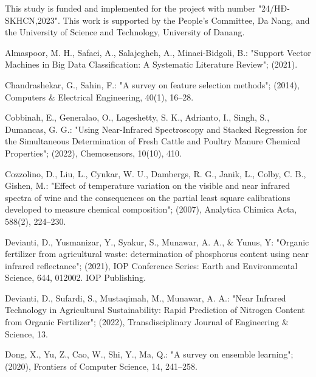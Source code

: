 \documentclass[10pt, a4paper, oneside]{article}
\begin{document}
\begin{Acknowledgements}
This study is funded and implemented for the project with number "24/HĐ-SKHCN,2023". This work is supported by the People’s Committee, Da Nang, and the University of Science and
Technology, University of Danang.
\end{Acknowledgements}

\begin{thebibliography}{}{

\fontsize{9pt}{10pt}\selectfont

 Almaspoor, M. H., Safaei, A., Salajegheh, A., Minaei-Bidgoli, B.: "Support Vector Machines in Big Data Classification: A Systematic Literature Review";  (2021).

 Chandrashekar, G., Sahin, F.: "A survey on feature selection methods"; (2014), Computers \& Electrical Engineering, 40(1), 16–28.

 Cobbinah, E., Generalao, O., Lageshetty, S. K., Adrianto, I., Singh, S., Dumancas, G. G.: "Using Near-Infrared Spectroscopy and Stacked Regression for the Simultaneous Determination of Fresh Cattle and Poultry Manure Chemical Properties"; (2022), Chemosensors, 10(10), 410.

 Cozzolino, D., Liu, L., Cynkar, W. U., Dambergs, R. G., Janik, L., Colby, C. B., Gishen, M.: "Effect of temperature variation on the visible and near infrared spectra of wine and the consequences on the partial least square calibrations developed to measure chemical composition"; (2007), Analytica Chimica Acta, 588(2), 224–230.

 Devianti, D., Yusmanizar, Y., Syakur, S., Munawar, A. A., \& Yunus, Y: "Organic fertilizer from agricultural waste: determination of phosphorus content using near infrared reflectance"; (2021), IOP Conference Series: Earth and Environmental Science, 644, 012002. IOP Publishing.

 Devianti, D., Sufardi, S., Mustaqimah, M., Munawar, A. A.: "Near Infrared Technology in Agricultural Sustainability: Rapid Prediction of Nitrogen Content from Organic Fertilizer"; (2022), Transdisciplinary Journal of Engineering \& Science, 13.

 Dong, X., Yu, Z., Cao, W., Shi, Y., Ma, Q.: "A survey on ensemble learning"; (2020), Frontiers of Computer Science, 14, 241–258.

}
\end{thebibliography}
\end{document}
